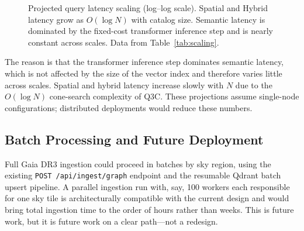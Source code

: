 \documentclass[preprint,12pt,authoryear]{elsarticle}
\begin{document}
\begin{figure}[htbp]
\centering
{}
\caption{\label{fig:scalability}Projected query latency scaling (log--log scale). Spatial and Hybrid latency grow as $O(\log N)$ with catalog size. Semantic latency is dominated by the fixed-cost transformer inference step and is nearly constant across scales. Data from Table~\ref{tab:scaling}.}
\end{figure}

The reason is that the transformer inference step dominates semantic latency, which is not affected by the size of the vector index and therefore varies little across scales. Spatial and hybrid latency increase slowly with $N$ due to the $O(\log N)$ cone-search complexity of Q3C. These projections assume single-node configurations; distributed deployments would reduce these numbers.

\subsection{Batch Processing and Future Deployment}

Full Gaia DR3 ingestion could proceed in batches by sky region, using the existing \texttt{POST /api/ingest/graph} endpoint and the resumable Qdrant batch upsert pipeline. A parallel ingestion run with, say, 100 workers each responsible for one sky tile is architecturally compatible with the current design and would bring total ingestion time to the order of hours rather than weeks. This is future work, but it is future work on a clear path---not a redesign.
\end{document}
